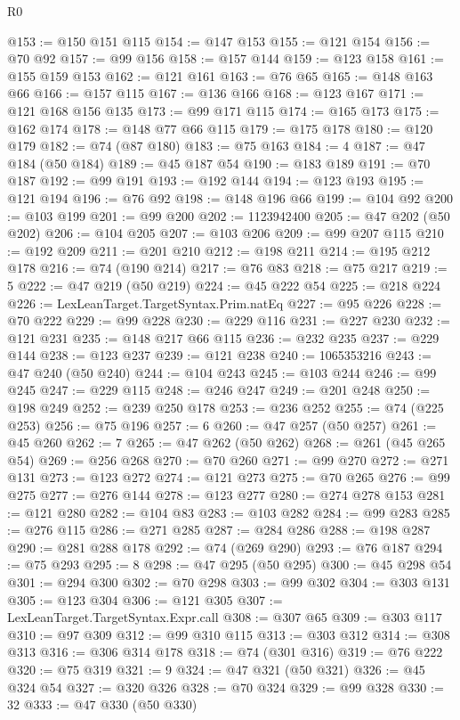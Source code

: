 \begin{lexlean}{R0}
\begin{coremodule}
@153 := @150 @151 @115
@154 := @147 @153
@155 := @121 @154
@156 := @70 @92
@157 := @99 @156
@158 := @157 @144
@159 := @123 @158
@161 := @155 @159 @153
@162 := @121 @161
@163 := @76 @65
@165 := @148 @163 @66
@166 := @157 @115
@167 := @136 @166
@168 := @123 @167
@171 := @121 @168 @156 @135
@173 := @99 @171 @115
@174 := @165 @173
@175 := @162 @174
@178 := @148 @77 @66 @115
@179 := @175 @178
@180 := @120 @179
@182 := @74 (@87 @180)
@183 := @75 @163
@184 := 4
@187 := @47 @184 (@50 @184)
@189 := @45 @187 @54
@190 := @183 @189
@191 := @70 @187
@192 := @99 @191
@193 := @192 @144
@194 := @123 @193
@195 := @121 @194
@196 := @76 @92
@198 := @148 @196 @66
@199 := @104 @92
@200 := @103 @199
@201 := @99 @200
@202 := 1123942400
@205 := @47 @202 (@50 @202)
@206 := @104 @205
@207 := @103 @206
@209 := @99 @207 @115
@210 := @192 @209
@211 := @201 @210
@212 := @198 @211
@214 := @195 @212 @178
@216 := @74 (@190 @214)
@217 := @76 @83
@218 := @75 @217
@219 := 5
@222 := @47 @219 (@50 @219)
@224 := @45 @222 @54
@225 := @218 @224
@226 := LexLeanTarget.TargetSyntax.Prim.natEq
@227 := @95 @226
@228 := @70 @222
@229 := @99 @228
@230 := @229 @116
@231 := @227 @230
@232 := @121 @231
@235 := @148 @217 @66 @115
@236 := @232 @235
@237 := @229 @144
@238 := @123 @237
@239 := @121 @238
@240 := 1065353216
@243 := @47 @240 (@50 @240)
@244 := @104 @243
@245 := @103 @244
@246 := @99 @245
@247 := @229 @115
@248 := @246 @247
@249 := @201 @248
@250 := @198 @249
@252 := @239 @250 @178
@253 := @236 @252
@255 := @74 (@225 @253)
@256 := @75 @196
@257 := 6
@260 := @47 @257 (@50 @257)
@261 := @45 @260
@262 := 7
@265 := @47 @262 (@50 @262)
@268 := @261 (@45 @265 @54)
@269 := @256 @268
@270 := @70 @260
@271 := @99 @270
@272 := @271 @131
@273 := @123 @272
@274 := @121 @273
@275 := @70 @265
@276 := @99 @275
@277 := @276 @144
@278 := @123 @277
@280 := @274 @278 @153
@281 := @121 @280
@282 := @104 @83
@283 := @103 @282
@284 := @99 @283
@285 := @276 @115
@286 := @271 @285
@287 := @284 @286
@288 := @198 @287
@290 := @281 @288 @178
@292 := @74 (@269 @290)
@293 := @76 @187
@294 := @75 @293
@295 := 8
@298 := @47 @295 (@50 @295)
@300 := @45 @298 @54
@301 := @294 @300
@302 := @70 @298
@303 := @99 @302
@304 := @303 @131
@305 := @123 @304
@306 := @121 @305
@307 := LexLeanTarget.TargetSyntax.Expr.call
@308 := @307 @65
@309 := @303 @117
@310 := @97 @309
@312 := @99 @310 @115
@313 := @303 @312
@314 := @308 @313
@316 := @306 @314 @178
@318 := @74 (@301 @316)
@319 := @76 @222
@320 := @75 @319
@321 := 9
@324 := @47 @321 (@50 @321)
@326 := @45 @324 @54
@327 := @320 @326
@328 := @70 @324
@329 := @99 @328
@330 := 32
@333 := @47 @330 (@50 @330)

\end{coremodule}
\end{lexlean}
